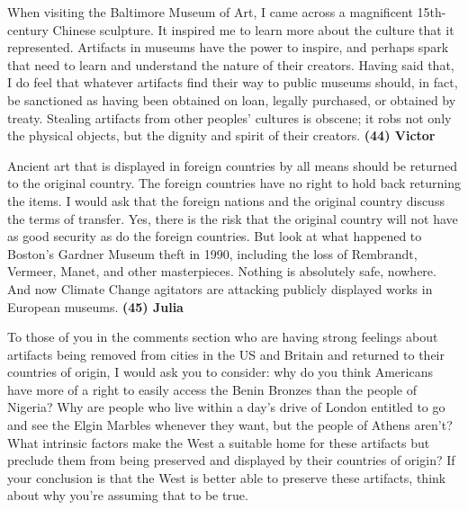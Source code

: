 \documentclass[UTF8,11pt]{ctexart}
\begin{document}
When visiting the Baltimore Museum of Art, I came across a magnificent 15th-century Chinese sculpture. It inspired me to learn more about the culture that it represented. Artifacts in museums have the power to inspire, and perhaps spark that need to learn and understand the nature of their creators. Having said that, I do feel that whatever artifacts find their way to public museums should, in fact, be sanctioned as having been obtained on loan, legally purchased, or obtained by treaty. Stealing artifacts from other peoples’ cultures is obscene; it robs not only the physical objects, but the dignity and spirit of their creators. \textbf{(44) Victor}


Ancient art that is displayed in foreign countries by all means should be returned to the original country. The foreign countries have no right to hold back returning the items. I would ask that the foreign nations and the original country discuss the terms of transfer. Yes, there is the risk that the original country will not have as good security as do the foreign countries. But look at what happened to Boston’s Gardner Museum theft in 1990, including the loss of Rembrandt, Vermeer, Manet, and other masterpieces. Nothing is absolutely safe, nowhere. And now Climate Change agitators are attacking publicly displayed works in European museums. \textbf{(45) Julia}


To those of you in the comments section who are having strong feelings about artifacts being removed from cities in the US and Britain and returned to their countries of origin, I would ask you to consider: why do you think Americans have more of a right to easily access the Benin Bronzes than the people of Nigeria? Why are people who live within a day’s drive of London entitled to go and see the Elgin Marbles whenever they want, but the people of Athens aren’t? What intrinsic factors make the West a suitable home for these artifacts but preclude them from being preserved and displayed by their countries of origin? If your conclusion is that the West is better able to preserve these artifacts, think about why you’re assuming that to be true.
\end{document}
